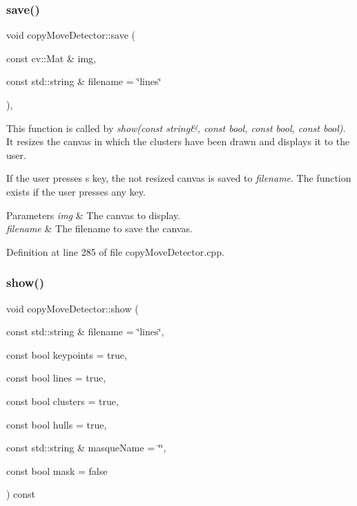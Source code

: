 \subsubsection{\texorpdfstring{save()}{save()}}
{\footnotesize\ttfamily void copy\+Move\+Detector\+::save (\begin{DoxyParamCaption}\item[{const cv\+::\+Mat \&}]{img,  }\item[{const std\+::string \&}]{filename = {\ttfamily \char`\"{}lines\char`\"{}} }\end{DoxyParamCaption})\hspace{0.3cm}{\ttfamily [static]}, {\ttfamily [private]}}

This function is called by {\itshape show(const string\&, const bool, const bool, const bool)}. It resizes the canvas in which the clusters have been drawn and displays it to the user.

If the user presses \textquotesingle{}s\textquotesingle{} key, the not resized canvas is saved to {\itshape filename}. The function exists if the user presses any key.


\begin{DoxyParams}{Parameters}
{\em img} & The canvas to display. \\
\hline
{\em filename} & The filename to save the canvas. \\
\hline
\end{DoxyParams}


Definition at line 285 of file copy\+Move\+Detector.\+cpp.

\mbox{\label{classdefals_1_1copy_move_detector_a5e773c10c8cbec7abb70ecf54422c19a}} 
\subsubsection{\texorpdfstring{show()}{show()}}
{\footnotesize\ttfamily void copy\+Move\+Detector\+::show (\begin{DoxyParamCaption}\item[{const std\+::string \&}]{filename = {\ttfamily \char`\"{}lines\char`\"{}},  }\item[{const bool}]{keypoints = {\ttfamily true},  }\item[{const bool}]{lines = {\ttfamily true},  }\item[{const bool}]{clusters = {\ttfamily true},  }\item[{const bool}]{hulls = {\ttfamily true},  }\item[{const std\+::string \&}]{masque\+Name = {\ttfamily \char`\"{}\char`\"{}},  }\item[{const bool}]{mask = {\ttfamily false} }\end{DoxyParamCaption}) const}

